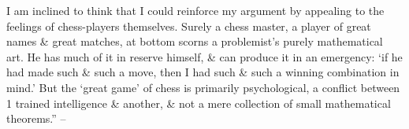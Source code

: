 \documentclass{article}
\numberwithin{equation}{section}
\begin{document}
I am inclined to think that I could reinforce my argument by appealing to the feelings of chess-players themselves. Surely a chess master, a player of great names \& great matches, at bottom scorns a problemist's purely mathematical art. He has much of it in reserve himself, \& can produce it in an emergency: `if he had made such \& such a move, then I had such \& such a winning combination in mind.' But the `great game' of chess is primarily psychological, a conflict between 1 trained intelligence \& another, \& not a mere collection of small mathematical theorems.'' -- \cite[pp. 112--115]{Hardy1992}


\printbibliography[heading=bibintoc]
	
\end{document}
